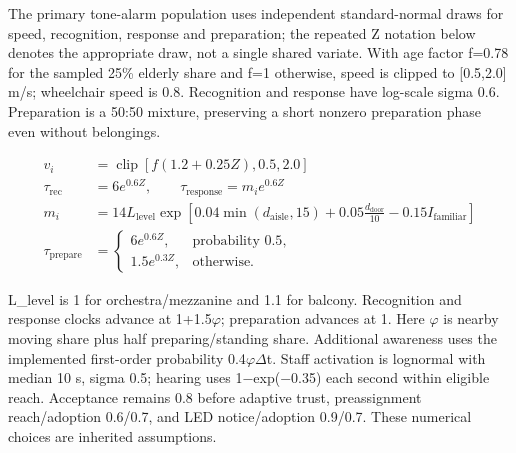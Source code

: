 \documentclass[11pt,a4paper]{article}
\begin{document}
The primary tone-alarm population uses independent standard-normal draws for speed, recognition, response and preparation; the repeated Z notation below denotes the appropriate draw, not a single shared variate. With age factor f=0.78 for the sampled 25\% elderly share and f=1 otherwise, speed is clipped to [0.5,2.0] m/s; wheelchair speed is 0.8. Recognition and response have log-scale sigma 0.6. Preparation is a 50:50 mixture, preserving a short nonzero preparation phase even without belongings.


\begin{equation}
\begin{aligned}
v_i&=\operatorname{clip}\!\left[f(1.2+0.25Z),0.5,2.0\right] \\
\tau_{\mathrm{rec}}&=6e^{0.6Z},\qquad\tau_{\mathrm{response}}=m_i e^{0.6Z} \\
m_i&=14L_{\mathrm{level}}\exp\!\left[0.04\min(d_{\mathrm{aisle}},15)+0.05\frac{d_{\mathrm{door}}}{10}-0.15I_{\mathrm{familiar}}\right] \\
\tau_{\mathrm{prepare}}&=\begin{cases}6e^{0.6Z},&\text{probability }0.5,\\1.5e^{0.3Z},&\text{otherwise.}\end{cases}
\end{aligned}
\tag{L6}\label{eq:L6}
\end{equation}

L\_level is 1 for orchestra/mezzanine and 1.1 for balcony. Recognition and response clocks advance at 1+1.5\ensuremath{\varphi}; preparation advances at 1. Here \ensuremath{\varphi} is nearby moving share plus half preparing/standing share. Additional awareness uses the implemented first-order probability 0.4\ensuremath{\varphi}\ensuremath{\Delta}t. Staff activation is lognormal with median 10 s, sigma 0.5; hearing uses 1\ensuremath{-}exp(\ensuremath{-}0.35) each second within eligible reach. Acceptance remains 0.8 before adaptive trust, preassignment reach/adoption 0.6/0.7, and LED notice/adoption 0.9/0.7. These numerical choices are inherited assumptions.
\end{document}
